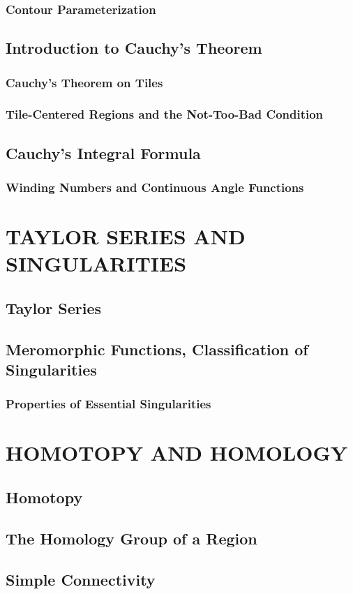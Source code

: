 \documentclass{refbook}
\begin{document}
\subsubsection{Contour Parameterization}
\subsection{Introduction to Cauchy's Theorem}
\subsubsection{Cauchy's Theorem on Tiles}
\subsubsection{Tile-Centered Regions and the Not-Too-Bad Condition}
\subsection{Cauchy's Integral Formula}
\subsubsection{Winding Numbers and Continuous Angle Functions}

\section{TAYLOR SERIES AND SINGULARITIES}
\subsection{Taylor Series}
\subsection{Meromorphic Functions, Classification of Singularities}
\subsubsection{Properties of Essential Singularities}

\section{HOMOTOPY AND HOMOLOGY}
\subsection{Homotopy}
\subsection{The Homology Group of a Region}
\subsection{Simple Connectivity}

\section{}
\end{document}
